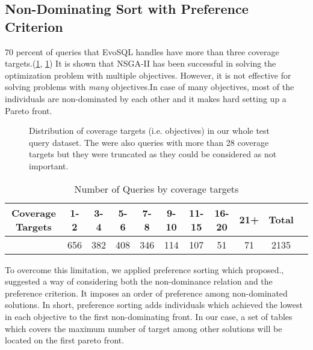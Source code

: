 \subsection{Non-Dominating Sort with Preference Criterion}
70 percent of queries that EvoSQL handles have more than three coverage targets.(\cref{fig:cov_targets_dist}, \cref{tbl:num_of_coverage_targets}) It is shown that NSGA-II has been successful in solving the optimization problem with multiple objectives. However, it is not effective for solving problems with \textit{many} objectives.In case of many objectives, most of the individuals are non-dominated by each other and it makes hard setting up a Pareto front. 


\begin{figure}
	\centering
	\caption{Distribution of coverage targets (i.e. objectives) in our whole test query dataset. The were also queries with more than 28 coverage targets but they were truncated as they could be considered as not important.}
	\label{fig:cov_targets_dist}
\end{figure}

\begin{table}
	\centering
	\caption{Number of Queries by coverage targets}
	
	\begin{tabular}{c|c|c|c|c|c|c|c|c|cr}
		Coverage Targets & 1-2 & 3-4 & 5-6 & 7-8 & 9-10 & 11-15 & 16-20 & 21+ & Total \\ 
		\hline
		& 656 & 382 & 408 & 346 & 114  & 107   & 51    & 71  & 2135
	\end{tabular} 
	\label{tbl:num_of_coverage_targets}
\end{table}


To overcome this limitation, we applied preference sorting which \cite{panichella2015reformulating} proposed., \cite{panichella2015reformulating} suggested a way of considering both the non-dominance relation and the preference criterion. It imposes an order of preference among non-dominated solutions. In short, preference sorting adds individuals which achieved the lowest in each objective to the first non-dominating front.  In our case, a set of tables which covers the maximum number of target among other solutions will be located on the first pareto front. 



